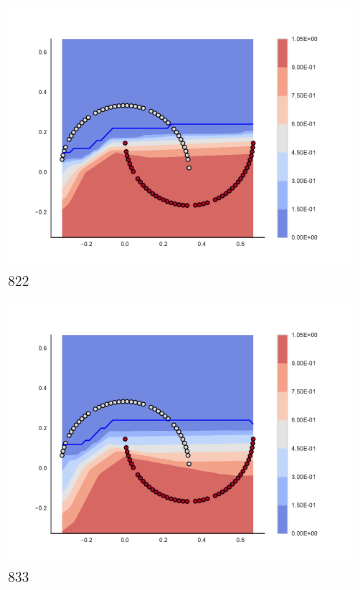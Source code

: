 \begin{figure}[h]
\begin{subfigure}[b]{0.09\textwidth}
    \includegraphics[clip, trim=2.35cm 1.75cm 4.5cm 0cm,width=\textwidth]{img/convergence/822.pdf}
    \caption{822}
    \label{fig:convergence_822}
\end{subfigure}
%
\begin{subfigure}[b]{0.09\textwidth}
    \includegraphics[clip, trim=2.35cm 1.75cm 4.5cm 0cm,width=\textwidth]{img/convergence/833.pdf}
    \caption{833}
    \label{fig:convergence_833}
\end{subfigure}
%
\begin{subfigure}[b]{0.09\textwidth}

\end{subfigure}
\end{figure}
